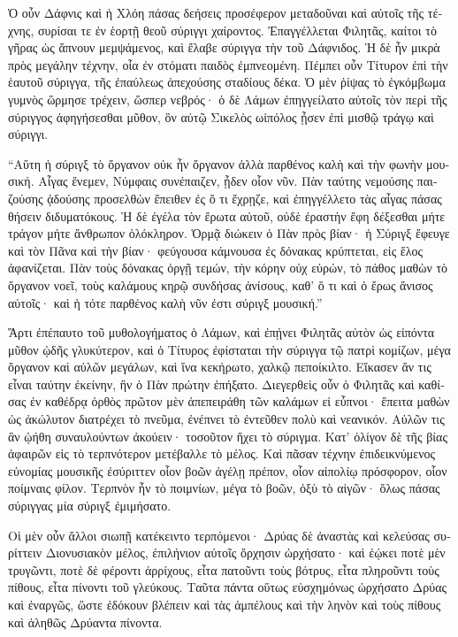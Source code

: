 \documentclass{book}
\begin{document}
\begin{pairs}
\begin{Leftside}
\begin{greek}
  Ὁ οὖν Δάφνις καὶ ἡ Χλόη πάσας δεήσεις προσέφερον μεταδοῦναι καὶ αὐτοῖς τῆς τέχνης, συρίσαι τε ἐν ἑορτῇ θεοῦ σύριγγι χαίροντος. Ἐπαγγέλλεται Φιλητᾶς, καίτοι τὸ γῆρας ὡς ἄπνουν μεμψάμενος, καὶ ἔλαβε σύριγγα τὴν τοῦ Δάφνιδος.  Ἡ δὲ ἦν μικρὰ πρὸς μεγάλην τέχνην, οἷα ἐν στόματι παιδὸς ἐμπνεομένη. Πέμπει οὖν Τίτυρον ἐπὶ τὴν ἑαυτοῦ σύριγγα,  τῆς ἐπαύλεως ἀπεχούσης σταδίους δέκα. Ὁ μὲν ῥίψας τὸ ἐγκόμβωμα γυμνὸς ὥρμησε τρέχειν, ὥσπερ νεβρός· ὁ δὲ Λάμων ἐπηγγείλατο αὐτοῖς τὸν περὶ τῆς σύριγγος ἀφηγήσεσθαι μῦθον, ὃν αὐτῷ Σικελὸς ωἰπόλος ᾖσεν ἐπὶ μισθῷ τράγῳ καὶ σύριγγι.
\pend


  “Αὕτη ἡ σύριγξ τὸ ὄργανον οὐκ ἦν ὄργανον ἀλλὰ παρθένος καλὴ καὶ τὴν φωνὴν μουσική. Αἶγας ἔνεμεν, Νύμφαις συνέπαιζεν, ᾖδεν οἷον νῦν. Πὰν ταύτης νεμούσης παιζούσης ᾀδούσης προσελθὼν ἔπειθεν ἐς ὅ τι ἔχρῃζε, καὶ ἐπηγγέλλετο τὰς αἶγας πάσας θήσειν διδυματόκους.  Ἡ δὲ ἐγέλα τὸν ἔρωτα αὐτοῦ, οὐδὲ ἐραστὴν ἔφη δέξεσθαι μήτε τράγον μήτε ἄνθρωπον ὁλόκληρον. Ὁρμᾷ διώκειν ὁ Πὰν πρὸς βίαν· ἡ Σύριγξ ἔφευγε καὶ τὸν Πᾶνα καὶ τὴν βίαν· φεύγουσα κάμνουσα ἐς δόνακας κρύπτεται, εἰς ἕλος ἀφανίζεται.  Πὰν τοὺς δόνακας ὀργῇ τεμών, τὴν κόρην οὐχ εὑρών, τὸ πάθος μαθὼν τὸ ὄργανον νοεῖ, τοὺς καλάμους κηρῷ συνδήσας ἀνίσους, καθ’ ὅ τι καὶ ὁ ἔρως ἄνισος αὐτοῖς· καὶ ἡ τότε παρθένος καλὴ νῦν ἐστι σύριγξ μουσική.”
\pend


  Ἄρτι ἐπέπαυτο τοῦ μυθολογήματος ὁ Λάμων, καὶ ἐπῄνει Φιλητᾶς αὐτὸν ὡς εἰπόντα μῦθον ᾠδῆς γλυκύτερον, καὶ ὁ Τίτυρος ἐφίσταται τὴν σύριγγα τῷ πατρὶ κομίζων, μέγα ὄργανον καὶ αὐλῶν μεγάλων,  καὶ ἵνα κεκήρωτο, χαλκῷ πεποίκιλτο. Εἴκασεν ἄν τις εἶναι ταύτην ἐκείνην, ἣν ὁ Πὰν πρώτην ἐπήξατο. Διεγερθεὶς οὖν ὁ Φιλητᾶς καὶ καθίσας ἐν καθέδρᾳ ὀρθὸς πρῶτον μὲν ἀπεπειράθη τῶν καλάμων εἰ εὖπνοι·  ἔπειτα μαθὼν ὡς ἀκώλυτον διατρέχει τὸ πνεῦμα, ἐνέπνει τὸ ἐντεῦθεν πολὺ καὶ νεανικόν. Αὐλῶν τις ἂν ᾠήθη συναυλούντων ἀκούειν· τοσοῦτον ἤχει τὸ σύριγμα. Κατ’ ὀλίγον δὲ τῆς βίας ἀφαιρῶν εἰς τὸ τερπνότερον μετέβαλλε τὸ μέλος.  Καὶ πᾶσαν τέχνην ἐπιδεικνύμενος εὐνομίας μουσικῆς ἐσύριττεν οἷον βοῶν ἀγέλῃ πρέπον, οἷον αἰπολίῳ πρόσφορον, οἷον ποίμναις φίλον. Τερπνὸν ἦν τὸ ποιμνίων, μέγα τὸ βοῶν, ὀξὺ τὸ αἰγῶν· ὅλως πάσας σύριγγας μία σύριγξ ἐμιμήσατο.
\pend


  Οἱ μὲν οὖν ἄλλοι σιωπῇ κατέκειντο τερπόμενοι· Δρύας δὲ ἀναστὰς καὶ κελεύσας συρίττειν Διονυσιακὸν μέλος, ἐπιλήνιον αὐτοῖς ὄρχησιν ὠρχήσατο· καὶ ἐῴκει ποτὲ μὲν τρυγῶντι, ποτὲ δὲ φέροντι ἀρρίχους,  εἶτα πατοῦντι τοὺς βότρυς, εἶτα πληροῦντι τοὺς πίθους, εἶτα πίνοντι τοῦ γλεύκους. Ταῦτα πάντα οὕτως εὐσχημόνως ὠρχήσατο Δρύας καὶ ἐναργῶς, ὥστε ἐδόκουν βλέπειν καὶ τὰς ἀμπέλους καὶ τὴν ληνὸν καὶ τοὺς πίθους καὶ ἀληθῶς Δρύαντα πίνοντα.
\pend



\end{greek}
\end{Leftside}
\end{pairs}
\end{document}
